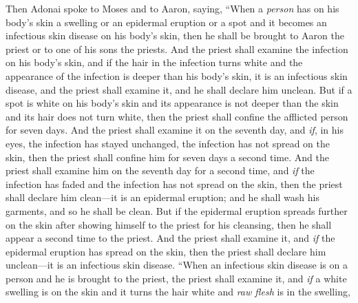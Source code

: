 \begin{biblechapter} %
 Then Adonai spoke to Moses and to Aaron, saying,
\verse “When a \textit{person} has on his body’s skin a swelling or an epidermal eruption or a spot and it becomes an infectious skin disease on his body’s skin, then he shall be brought to Aaron the priest or to one of his sons the priests.
\verse And the priest shall examine the infection on his body’s skin, and if the hair in the infection turns white and the appearance of the infection is deeper than his body’s skin, it is an infectious skin disease, and the priest shall examine it, and he shall declare him unclean.
\verse But if a spot is white on his body’s skin and its appearance is not deeper than the skin and its hair does not turn white, then the priest shall confine the afflicted person for seven days.
\verse And the priest shall examine it on the seventh day, and \textit{if}, in his eyes, the infection has stayed unchanged, the infection has not spread on the skin, then the priest shall confine him for seven days a second time.
\verse And the priest shall examine him on the seventh day for a second time, and \textit{if} the infection has faded and the infection has not spread on the skin, then the priest shall declare him clean—it is an epidermal eruption; and he shall wash his garments, and so he shall be clean.
\verse But if the epidermal eruption spreads further on the skin after showing himself to the priest for his cleansing, then he shall appear a second time to the priest.
\verse And the priest shall examine it, and \textit{if} the epidermal eruption has spread on the skin, then the priest shall declare him unclean—it is an infectious skin disease.
\verse “When an infectious skin disease is on a person and he is brought to the priest,
\verse the priest shall examine it, and \textit{if} a white swelling is on the skin and it turns the hair white and \textit{raw flesh} is in the swelling,

\end{biblechapter}
